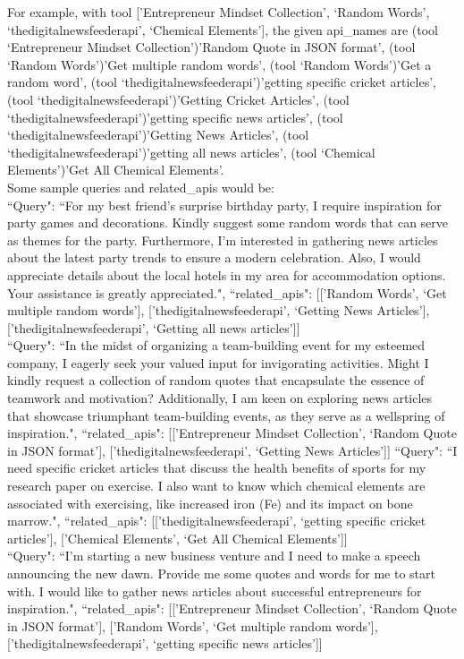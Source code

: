 For example, with tool ['Entrepreneur Mindset Collection', `Random Words', `thedigitalnewsfeederapi', `Chemical Elements'], the given api\_names are (tool `Entrepreneur Mindset Collection')'Random Quote in JSON format', (tool `Random Words')'Get multiple random words', (tool `Random Words')'Get a random word', (tool `thedigitalnewsfeederapi')'getting specific cricket articles', (tool `thedigitalnewsfeederapi')'Getting Cricket Articles', (tool `thedigitalnewsfeederapi')'getting specific news articles', (tool `thedigitalnewsfeederapi')'Getting News Articles', (tool `thedigitalnewsfeederapi')'getting all news articles', (tool `Chemical Elements')'Get All Chemical Elements'. \\
Some sample queries and related\_apis would be: \\
``Query": ``For my best friend's surprise birthday party, I require inspiration for party games and decorations. Kindly suggest some random words that can serve as themes for the party. Furthermore, I'm interested in gathering news articles about the latest party trends to ensure a modern celebration. Also, I would appreciate details about the local hotels in my area for accommodation options. Your assistance is greatly appreciated.", ``related\_apis": [['Random Words', `Get multiple random words'], ['thedigitalnewsfeederapi', `Getting News Articles'], ['thedigitalnewsfeederapi', `Getting all news articles']] \\
``Query": ``In the midst of organizing a team-building event for my esteemed company, I eagerly seek your valued input for invigorating activities. Might I kindly request a collection of random quotes that encapsulate the essence of teamwork and motivation? Additionally, I am keen on exploring news articles that showcase triumphant team-building events, as they serve as a wellspring of inspiration.", ``related\_apis": [['Entrepreneur Mindset Collection', `Random Quote in JSON format'], ['thedigitalnewsfeederapi', `Getting News Articles']]
``Query": ``I need specific cricket articles that discuss the health benefits of sports for my research paper on exercise. I also want to know which chemical elements are associated with exercising, like increased iron (Fe) and its impact on bone marrow.", ``related\_apis": [['thedigitalnewsfeederapi', `getting specific cricket articles'], ['Chemical Elements', `Get All Chemical Elements']] \\
``Query": ``I'm starting a new business venture and I need to make a speech announcing the new dawn. Provide me some quotes and words for me to start with. I would like to gather news articles about successful entrepreneurs for inspiration.", ``related\_apis": [['Entrepreneur Mindset Collection', `Random Quote in JSON format'], ['Random Words', `Get multiple random words'], ['thedigitalnewsfeederapi', `getting specific news articles']] \\
